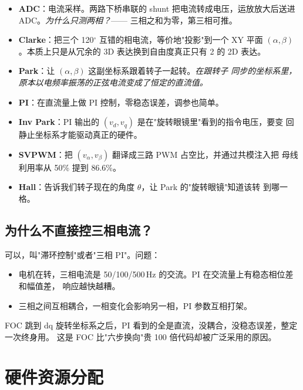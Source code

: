 \documentclass[UTF8,a4paper,11pt]{ctexart}
\begin{document}
\begin{itemize}
  \item \textbf{ADC}：电流采样。两路下桥串联的 shunt 把电流转成电压，运放放大后送进
        ADC。\emph{为什么只测两相？}—— 三相之和为零，第三相可推。
  \item \textbf{Clarke}：把三个 120$^\circ$ 互错的相电流，等价地"投影"到一个 XY 平面
        $(\alpha,\beta)$。本质上只是从冗余的 3D 表达换到自由度真正只有 2 的 2D 表达。
  \item \textbf{Park}：让 $(\alpha,\beta)$ 这副坐标系跟着转子一起转。\emph{在跟转子
        同步的坐标系里，原本以电频率振荡的正弦电流变成了恒定的直流值。}
  \item \textbf{PI}：在直流量上做 PI 控制，零稳态误差，调参也简单。
  \item \textbf{Inv Park}：PI 输出的 $(v_d, v_q)$ 是在"旋转眼镜里"看到的指令电压，要变
        回静止坐标系才能驱动真正的硬件。
  \item \textbf{SVPWM}：把 $(v_\alpha, v_\beta)$ 翻译成三路 PWM 占空比，并通过共模注入把
        母线利用率从 50\% 提到 86.6\%。
  \item \textbf{Hall}：告诉我们转子现在的角度 $\theta$，让 Park 的"旋转眼镜"知道该转
        到哪一格。
\end{itemize}

\subsection{为什么不直接控三相电流？}

可以，叫"滞环控制"或者"三相 PI"。问题：

\begin{itemize}
  \item 电机在转，三相电流是 50/100/500\,Hz 的交流。PI 在交流量上有稳态相位差和幅值差，
        响应越快越糟。
  \item 三相之间互相耦合，一相变化会影响另一相，PI 参数互相打架。
\end{itemize}

FOC 跳到 dq 旋转坐标系之后，PI 看到的全是直流，没耦合，没稳态误差，整定一次终身用。
这是 FOC 比"六步换向"贵 100 倍代码却被广泛采用的原因。

\section{硬件资源分配}
\end{document}
